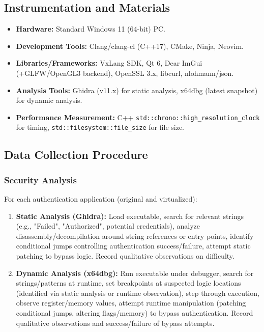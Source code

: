 \subsection{Instrumentation and Materials}
\begin{itemize}
    \item \textbf{Hardware:} Standard Windows 11 (64-bit) PC.
    \item \textbf{Development Tools:} Clang/clang-cl (C++17), CMake, Ninja, Neovim.
    \item \textbf{Libraries/Frameworks:} VxLang SDK, Qt 6, Dear ImGui (+GLFW/OpenGL3 backend), OpenSSL 3.x, libcurl, nlohmann/json.
    \item \textbf{Analysis Tools:} Ghidra (v11.x) for static analysis, x64dbg (latest snapshot) for dynamic analysis.
    \item \textbf{Performance Measurement:} C++ \texttt{std::chrono::high\_resolution\_clock} for timing, \texttt{std::filesystem::file\_size} for file size.
\end{itemize}

\subsection{Data Collection Procedure}

\subsubsection{Security Analysis}
For each authentication application (original and virtualized):
    \begin{enumerate}
        \item \textbf{Static Analysis (Ghidra):} Load executable, search for relevant strings (e.g., "Failed", "Authorized", potential credentials), analyze disassembly/decompilation around string references or entry points, identify conditional jumps controlling authentication success/failure, attempt static patching to bypass logic. Record qualitative observations on difficulty.
        \item \textbf{Dynamic Analysis (x64dbg):} Run executable under debugger, search for strings/patterns at runtime, set breakpoints at suspected logic locations (identified via static analysis or runtime observation), step through execution, observe register/memory values, attempt runtime manipulation (patching conditional jumps, altering flags/memory) to bypass authentication. Record qualitative observations and success/failure of bypass attempts.
    \end{enumerate}

